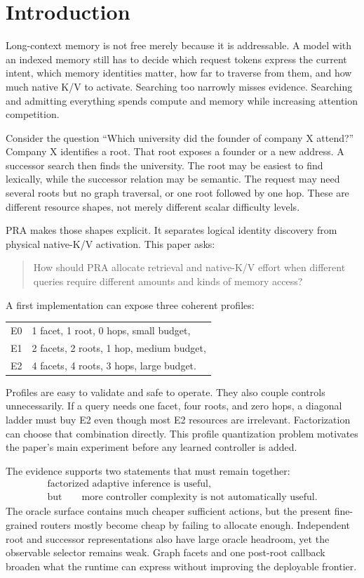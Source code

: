 \documentclass[11pt]{article}
\begin{document}
\section{Introduction}

Long-context memory is not free merely because it is addressable. A model with an indexed memory
still has to decide which request tokens express the current intent, which memory identities matter,
how far to traverse from them, and how much native K/V to activate. Searching too narrowly misses
evidence. Searching and admitting everything spends compute and memory while increasing attention
competition.

Consider the question ``Which university did the founder of company X attend?'' Company X identifies
a root. That root exposes a founder or a new address. A successor search then finds the university.
The root may be easiest to find lexically, while the successor relation may be semantic. The request
may need several roots but no graph traversal, or one root followed by one hop. These are different
resource shapes, not merely different scalar difficulty levels.

PRA makes those shapes explicit. It separates logical identity discovery from physical native-K/V
activation. This paper asks:
\begin{quote}
How should PRA allocate retrieval and native-K/V effort when different queries require different
amounts and kinds of memory access?
\end{quote}

A first implementation can expose three coherent profiles:
\begin{center}
\begin{tabular}{ll}
E0 & 1 facet, 1 root, 0 hops, small budget,\\
E1 & 2 facets, 2 roots, 1 hop, medium budget,\\
E2 & 4 facets, 4 roots, 3 hops, large budget.
\end{tabular}
\end{center}
Profiles are easy to validate and safe to operate. They also couple controls unnecessarily. If a
query needs one facet, four roots, and zero hops, a diagonal ladder must buy E2 even though most E2
resources are irrelevant. Factorization can choose that combination directly. This profile
quantization problem motivates the paper's main experiment before any learned controller is added.

The evidence supports two statements that must remain together:
\[
\begin{gathered}
\boxed{\text{factorized adaptive inference is useful}},\\[.5ex]
\text{but}\qquad
\boxed{\text{more controller complexity is not automatically useful}}.
\end{gathered}
\]
The oracle surface contains much cheaper sufficient actions, but the present fine-grained routers
mostly become cheap by failing to allocate enough. Independent root and successor representations
also have large oracle headroom, yet the observable selector remains weak. Graph facets and one
post-root callback broaden what the runtime can express without improving the deployable frontier.
\end{document}
